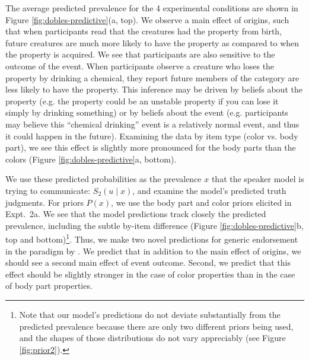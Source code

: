 \documentclass[12pt,letterpaper]{article}
\begin{document}
The average predicted prevalence for the 4 experimental conditions are shown in Figure \ref{fig:dobles-predictive}(a, top).
We observe a main effect of origins, such that when participants read that the creatures had the property from birth, future creatures  are much more likely to have the property as compared to when the property is acquired.
We see that participants are also sensitive to the outcome of the event.
When participants observe a creature who loses the property by drinking a chemical, they report future members of the category are less likely to have the property.
This inference may be driven by beliefs about the property (e.g. the property could be an unstable property if you can lose it simply by drinking something) or by beliefs about the event (e.g. participants may believe this ``chemical drinking'' event is a relatively normal event, and thus it could happen in the future).
Examining the data by item type (color vs. body part), we see this effect is slightly more pronounced for the body parts than the colors (Figure \ref{fig:dobles-predictive}a, bottom). 

We use these predicted probabilities as the prevalence $x$ that the speaker model is trying to communicate: $S_2(u\mid x)$, and examine the model's predicted truth judgments.
For priors $P(x)$, we use the body part and color priors elicited in Expt.~2a.
We see that the model predictions track closely the predicted prevalence, including the subtle by-item difference (Figure \ref{fig:dobles-predictive}b, top and bottom)\footnote{Note that our model's predictions do not deviate substantially from the predicted prevalence because there are only two different priors being used, and the shapes of those distributions do not vary appreciably (see Figure \ref{fig:prior2}).
}.
Thus, we make two novel predictions for generic endorsement in the paradigm by .
We predict that in addition to the main effect of origins, we should see a second main effect of event outcome.
Second, we predict that this effect should be slightly stronger in the case of color properties than in the case of body part properties.
\end{document}
